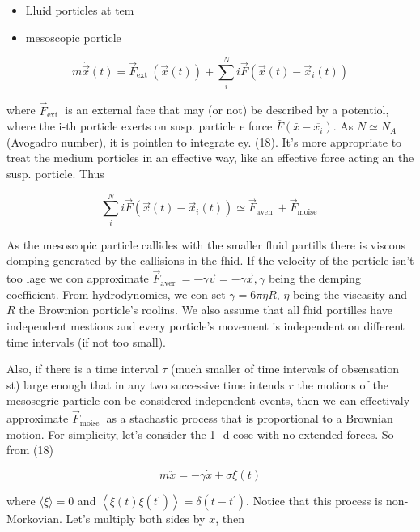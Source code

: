 \begin{itemize}
  \item Lluid porticles at tem
  \item mesoscopic porticle
\end{itemize}


\begin{equation*}
m \ddot{\vec{x}}(t)=\vec{F}_{\text {ext }}(\vec{x}(t))+\sum_{i}^{N} i \vec{F}\left(\vec{x}(t)-\vec{x}_{i}(t)\right) \tag{18}
\end{equation*}


where $\vec{F}_{\text {ext }}$ is an external face that may (or not) be described by a potentiol, where the i-th porticle exerts on susp. particle e force $\bar{F}\left(\bar{x}-\overline{x_{i}}\right)$. As $N \simeq N_{A}$ (Avogadro number), it is pointlen to integrate ey. (18). It's more appropriate to treat the medium porticles in an effective way, like an effective force acting an the susp. porticle. Thus

$$ \sum_{i}^{N} i \vec{F}\left(\vec{x}(t)-\vec{x}_{i}(t)\right) \simeq \vec{F}_{\text {aven }}+\vec{F}_{\text {moise }} $$

As the mesoscopic particle callides with the smaller fluid partills there is viscons domping generated by the callisions in the fhid. If the velocity of the perticle isn't too lage we con approximate $\vec{F}_{\text {aver }}=-\gamma \vec{v}=-\gamma \dot{\vec{x}}, \gamma$ being the demping coefficient. From hydrodynomics, we con set $\gamma=6 \pi \eta R$, $\eta$ being the viscasity and $R$ the Browmion porticle's roolins.
We also assume that all fhid portilles have independent mestions and every porticle's movement is independent on different time intervals (if not too small).

Also, if there is a time interval $\tau$ (much smaller of time intervals of obsensation st) large enough that in any two successive time intends $r$ the motions of the mesosegric particle con be considered independent events, then we can effectivaly approximate $\vec{F}_{\text {moise }}$ as a stachastic process that is proportional to a Brownian motion.
For simplicity, let's consider the 1 -d cose with no extended forces. So from (18)


\begin{equation*}
m \ddot{x}=-\gamma \dot{x}+\sigma \xi(t) \tag{19}
\end{equation*}

where $\langle\xi\rangle=0$ and $\left\langle\xi(t) \xi\left(t^{\prime}\right)\right\rangle=\delta\left(t-t^{\prime}\right)$. Notice that this process is non-Morkovian. Let's multiply both sides by $x$, then

